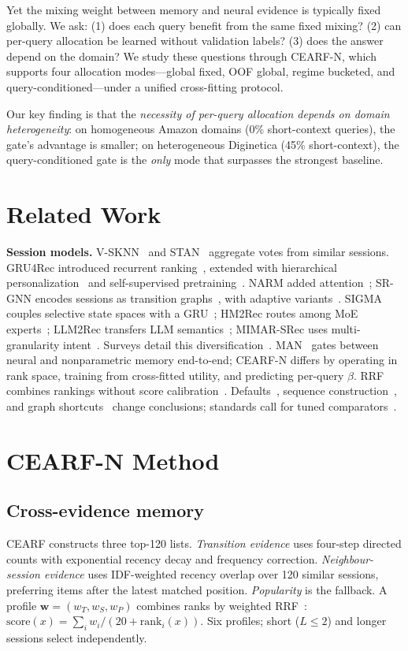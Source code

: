 \documentclass[runningheads]{llncs}
\newcommand{\method}{CEARF-N}
\begin{document}
Yet the mixing weight between memory and neural evidence is typically fixed
globally. We ask: (1) does each query benefit from the same fixed mixing?
(2) can per-query allocation be learned without validation labels? (3) does
the answer depend on the domain? We study these questions through \method{},
which supports four allocation modes---global fixed, OOF global, regime
bucketed, and query-conditioned---under a unified cross-fitting protocol.

Our key finding is that the \emph{necessity of per-query allocation depends
on domain heterogeneity}: on homogeneous Amazon domains (0\% short-context
queries), the gate's advantage is smaller; on heterogeneous Diginetica (45\%
short-context), the query-conditioned gate is the \emph{only} mode that
surpasses the strongest baseline.

\section{Related Work}
\textbf{Session models.} V-SKNN~\cite{ludewig2018evaluation} and
STAN~\cite{garg2019stan} aggregate votes from similar sessions. GRU4Rec
introduced recurrent ranking~\cite{hidasi2016gru4rec}, extended with
hierarchical personalization~\cite{quadrana2018recsys} and self-supervised
pretraining~\cite{kang2018s3rec}. NARM added attention~\cite{li2017narm};
SR-GNN encodes sessions as transition graphs~\cite{wu2019srgnn}, with
adaptive variants~\cite{wu2025srgnn4rec}. SIGMA couples selective state
spaces with a GRU~\cite{sigma2025}; HM2Rec routes among MoE
experts~\cite{liu2026hm2rec}; LLM2Rec transfers LLM
semantics~\cite{llm2rec2025}; MIMAR-SRec uses multi-granularity
intent~\cite{fang2026mimar}. Surveys detail this
diversification~\cite{li2025survey,pan2026survey,lin2025ssmsurvey}.
MAN~\cite{man2020memory} gates between neural and nonparametric memory
end-to-end; \method{} differs by operating in rank space, training from
cross-fitted utility, and predicting per-query $\beta$.
RRF combines rankings without score calibration~\cite{cormack2009rrf}.
Defaults~\cite{defaults2025}, sequence construction~\cite{seqsplit2026}, and
graph shortcuts~\cite{graphshortcut2026} change conclusions; standards call
for tuned comparators~\cite{jannach2026standards}.

\section{\method{} Method}
\subsection{Cross-evidence memory}
CEARF constructs three top-120 lists. \emph{Transition evidence} uses
four-step directed counts with exponential recency decay and frequency
correction. \emph{Neighbour-session evidence} uses IDF-weighted recency
overlap over 120 similar sessions, preferring items after the latest matched
position. \emph{Popularity} is the fallback. A profile
$\mathbf w=(w_T,w_S,w_P)$ combines ranks by weighted
RRF~\cite{cormack2009rrf}: $\text{score}(x)=\sum_i w_i/(20+\text{rank}_i(x))$.
Six profiles; short ($L\!\leq\!2$) and longer sessions select independently.
\end{document}
